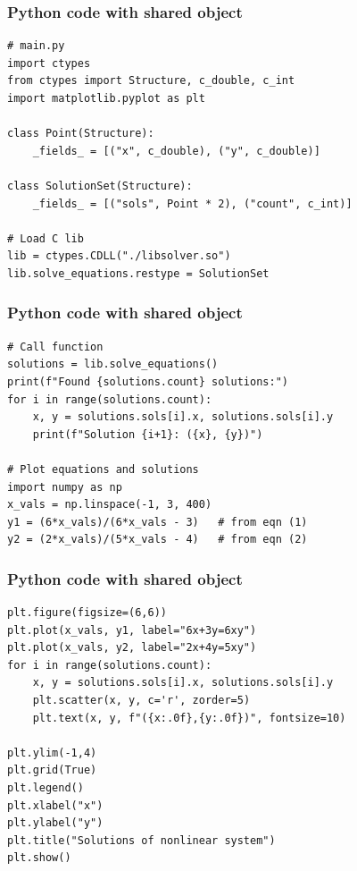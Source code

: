 \documentclass{beamer}
\begin{document}
\begin{frame}[fragile]
\frametitle{Python code with shared object}
\begin{lstlisting}
# main.py
import ctypes
from ctypes import Structure, c_double, c_int
import matplotlib.pyplot as plt

class Point(Structure):
    _fields_ = [("x", c_double), ("y", c_double)]

class SolutionSet(Structure):
    _fields_ = [("sols", Point * 2), ("count", c_int)]

# Load C lib
lib = ctypes.CDLL("./libsolver.so")
lib.solve_equations.restype = SolutionSet
\end{lstlisting}
\end{frame}
\begin{frame}[fragile]
\frametitle{Python code with shared object}
\begin{lstlisting}
# Call function
solutions = lib.solve_equations()
print(f"Found {solutions.count} solutions:")
for i in range(solutions.count):
    x, y = solutions.sols[i].x, solutions.sols[i].y
    print(f"Solution {i+1}: ({x}, {y})")

# Plot equations and solutions
import numpy as np
x_vals = np.linspace(-1, 3, 400)
y1 = (6*x_vals)/(6*x_vals - 3)   # from eqn (1)
y2 = (2*x_vals)/(5*x_vals - 4)   # from eqn (2)
\end{lstlisting}
\end{frame}
\begin{frame}[fragile]
\frametitle{Python code with shared object}
\begin{lstlisting}
plt.figure(figsize=(6,6))
plt.plot(x_vals, y1, label="6x+3y=6xy")
plt.plot(x_vals, y2, label="2x+4y=5xy")
for i in range(solutions.count):
    x, y = solutions.sols[i].x, solutions.sols[i].y
    plt.scatter(x, y, c='r', zorder=5)
    plt.text(x, y, f"({x:.0f},{y:.0f})", fontsize=10)

plt.ylim(-1,4)
plt.grid(True)
plt.legend()
plt.xlabel("x")
plt.ylabel("y")
plt.title("Solutions of nonlinear system")
plt.show()


\end{lstlisting}
\end{frame}
\end{document}
